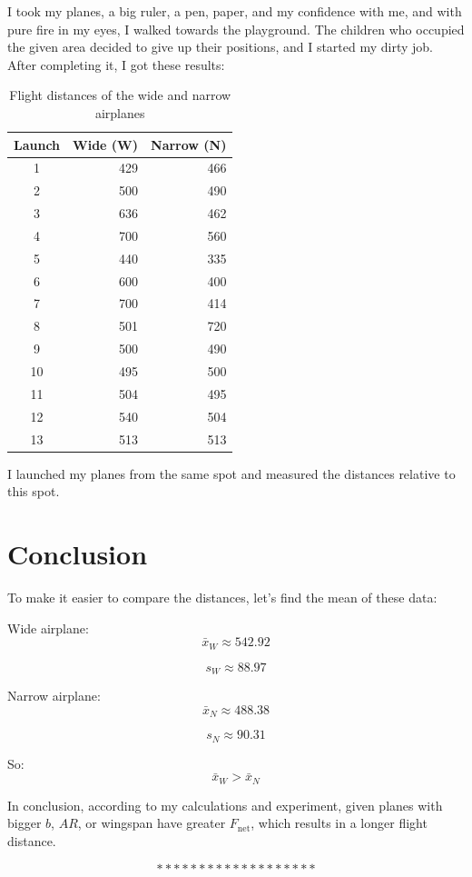 \documentclass[12pt]{article}
\begin{document}
I took my planes, a big ruler, a pen, paper, and my confidence with me, and with pure fire in my eyes, I walked towards the playground. The children who occupied the given area decided to give up their positions, and I started my dirty job. After completing it, I got these results:

\begin{table}[H]
\centering
\caption{Flight distances of the wide and narrow airplanes}
\begin{tabular}{c|r|r}
\hline
\textbf{Launch} & \textbf{Wide (W)} & \textbf{Narrow (N)} \\
\hline
1  & 429 & 466 \\
2  & 500 & 490 \\
3  & 636 & 462 \\
4  & 700 & 560 \\
5  & 440 & 335 \\
6  & 600 & 400 \\
7  & 700 & 414 \\
8  & 501 & 720 \\
9  & 500 & 490 \\
10 & 495 & 500 \\
11 & 504 & 495 \\
12 & 540 & 504 \\
13 & 513 & 513 \\
\hline
\end{tabular}
\end{table}

I launched my planes from the same spot and measured the distances relative to this spot.

\section{Conclusion}

To make it easier to compare the distances, let's find the mean of these data:

Wide airplane:
\[
\bar{x}_W\approx542.92
\]

\[
s_W\approx88.97
\]

Narrow airplane:
\[
\bar{x}_N\approx488.38
\]

\[
s_N\approx90.31
\]

So:
\[
\bar{x}_W > \bar{x}_N
\]

In conclusion, according to my calculations and experiment, given planes with bigger $b$, $AR$, or wingspan have greater $F_{\mathrm{net}}$, which results in a longer flight distance.

\bigskip

\[
*******************
\]
\end{document}
